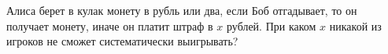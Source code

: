 Алиса берет в кулак монету в рубль или два, если Боб отгадывает, то он получает монету, иначе он платит
штраф в $x$ рублей. При каком $x$ никакой из игроков не сможет систематически выигрывать?
